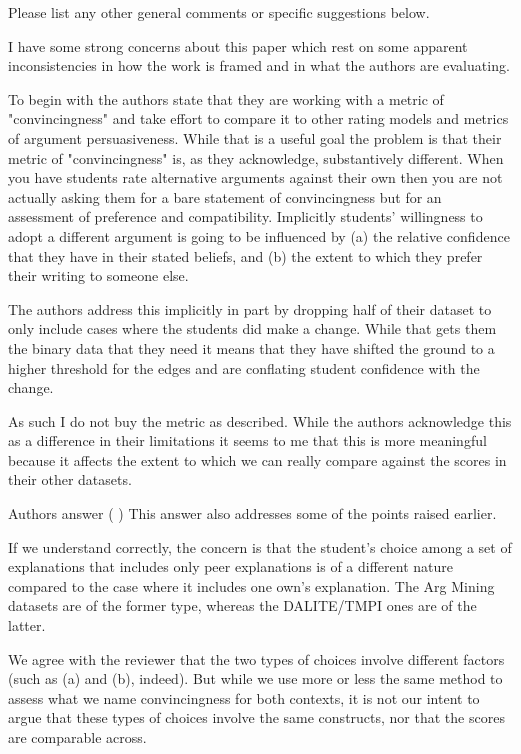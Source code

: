 \documentclass[notitlepage,12pt]{article}
\makeatletter
\newcounter{answ}
\newcommand{\customlabel}[2]{%
\protected@write \@auxout {}{\string \newlabel {#1}{{#2}{}}}}
\makeatother
\begin{document}
    \begin{revcomment}{Please list any other general comments or specific suggestions below.}

    I have some strong concerns about this paper which rest on some apparent inconsistencies in how the work is framed and in what the authors are evaluating.

    To begin with the authors state that they are working with a metric of "convincingness" and take effort to compare it to other rating models and metrics of argument persuasiveness. While that is a useful goal the problem is that their metric of "convincingness" is, as they acknowledge, substantively different. When you have students rate alternative arguments against their own then you are not actually asking them for a bare statement of convincingness but for an assessment of preference and compatibility. Implicitly students' willingness to adopt a different argument is going to be influenced by (a) the relative confidence that they have in their stated beliefs, and (b) the extent to which they prefer their writing to someone else.

The authors address this implicitly in part by dropping half of their dataset to only include cases where the students did make a change. While that gets them the binary data that they need it means that they have shifted the ground to a higher threshold for the edges and are conflating student confidence with the change. 

As such I do not buy the metric as described. While the authors acknowledge this as a difference in their limitations it seems to me that this is more meaningful because it affects the extent to which we can really compare against the scores in their other datasets.

\begin{authorstwo}{Authors answer (\textt{\theansw}\customlabel{limittwo}{\textt{\theansw}})}
  This answer also addresses some of the points raised earlier.

  If we understand correctly, the concern is that the student's choice among a set of explanations that includes only peer explanations is of a different nature compared to the case where it includes one own's explanation.  The Arg Mining datasets are of the former type, whereas the DALITE/TMPI ones are of the latter.

  We agree with the reviewer that the two types of choices involve different factors (such as (a) and (b), indeed).  But while we use more or less the same method to assess what we name convincingness for both contexts, it is not our intent to argue that these types of choices involve the same constructs, nor that the scores are comparable across.


\end{authorstwo}
\end{revcomment}
\end{document}
